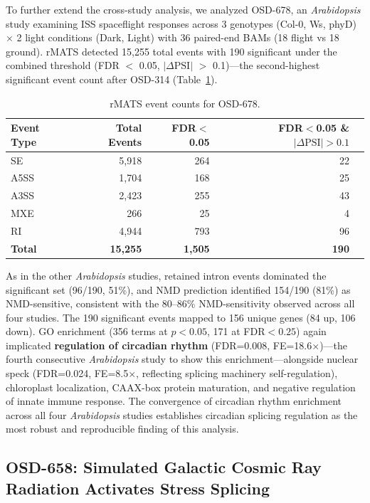 \documentclass[12pt,a4paper]{article}
\begin{document}
To further extend the cross-study analysis, we analyzed OSD-678, an \textit{Arabidopsis} study examining ISS spaceflight responses across 3 genotypes (Col-0, Ws, phyD) $\times$ 2 light conditions (Dark, Light) with 36 paired-end BAMs (18 flight vs 18 ground). rMATS detected 15,255 total events with 190 significant under the combined threshold (FDR $<$ 0.05, $|\Delta\text{PSI}|$ $>$ 0.1)---the second-highest significant event count after OSD-314 (Table~\ref{tab:osd678_events}).

\begin{table}[h]
\centering
\caption{rMATS event counts for OSD-678.}
\label{tab:osd678_events}
\begin{tabular}{lrrrr}
\toprule
Event Type & Total Events & FDR$<$0.05 & FDR$<$0.05 \& $|\Delta\text{PSI}|>0.1$ \\
\midrule
SE & 5,918 & 264 & 22 \\
A5SS & 1,704 & 168 & 25 \\
A3SS & 2,423 & 255 & 43 \\
MXE & 266 & 25 & 4 \\
RI & 4,944 & 793 & 96 \\
\textbf{Total} & \textbf{15,255} & \textbf{1,505} & \textbf{190} \\
\bottomrule
\end{tabular}
\end{table}

As in the other \textit{Arabidopsis} studies, retained intron events dominated the significant set (96/190, 51\%), and NMD prediction identified 154/190 (81\%) as NMD-sensitive, consistent with the 80--86\% NMD-sensitivity observed across all four studies. The 190 significant events mapped to 156 unique genes (84 up, 106 down). GO enrichment (356 terms at $p<0.05$, 171 at FDR$<0.25$) again implicated \textbf{regulation of circadian rhythm} (FDR=0.008, FE=18.6$\times$)---the fourth consecutive \textit{Arabidopsis} study to show this enrichment---alongside nuclear speck (FDR=0.024, FE=8.5$\times$, reflecting splicing machinery self-regulation), chloroplast localization, CAAX-box protein maturation, and negative regulation of innate immune response. The convergence of circadian rhythm enrichment across all four \textit{Arabidopsis} studies establishes circadian splicing regulation as the most robust and reproducible finding of this analysis.

\subsection{OSD-658: Simulated Galactic Cosmic Ray Radiation Activates Stress Splicing}
\end{document}
